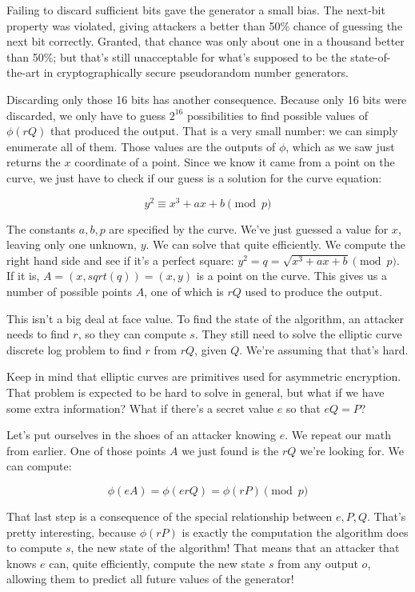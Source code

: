 \documentclass[11pt,ebook,table,dvipsnames]{memoir}
\begin{document}
Failing to discard sufficient bits gave the generator a small bias.
The next-bit property was violated, giving attackers a better than 50\%
chance of guessing the next bit correctly. Granted, that chance was
only about one in a thousand better than 50\%; but that's still
unacceptable for what's supposed to be the state-of-the-art in
cryptographically secure pseudorandom number generators.

Discarding only those 16 bits has another consequence. Because only 16
bits were discarded, we only have to guess $2^{16}$ possibilities to
find possible values of $\phi(rQ)$ that produced the output. That is a
very small number: we can simply enumerate all of them. Those values
are the outputs of $\phi$, which as we saw just returns the $x$
coordinate of a point. Since we know it came from a point on the
curve, we just have to check if our guess is a solution for the curve
equation:

\[
y^2 \equiv x^3 + ax + b \pmod p
\]

The constants $a, b, p$ are specified by the curve. We've just guessed
a value for $x$, leaving only one unknown, $y$. We can solve that
quite efficiently. We compute the right hand side and see if it's a
perfect square: $y^2 = q = \sqrt{x^3 + ax + b} \pmod p$. If it is, $A
= (x, sqrt(q)) = (x, y)$ is a point on the curve. This gives us a
number of possible points $A$, one of which is $rQ$ used to produce
the output.

This isn't a big deal at face value. To find the state of the
algorithm, an attacker needs to find $r$, so they can compute $s$.
They still need to solve the elliptic curve discrete log problem to
find $r$ from $rQ$, given $Q$. We're assuming that that's hard.

Keep in mind that elliptic curves are primitives used for asymmetric
encryption. That problem is expected to be hard to solve in general,
but what if we have some extra information? What if there's a secret
value $e$ so that $eQ=P$?

Let's put ourselves in the shoes of an attacker knowing $e$. We repeat
our math from earlier. One of those points $A$ we just found is the
$rQ$ we're looking for. We can compute:

\[
\phi(eA) = \phi(erQ) = \phi(rP) \pmod p
\]

That last step is a consequence of the special relationship between
$e, P, Q$. That's pretty interesting, because $\phi(rP)$ is exactly
the computation the algorithm does to compute $s$, the new state of
the algorithm! That means that an attacker that knows $e$ can, quite
efficiently, compute the new state $s$ from any output $o$, allowing
them to predict all future values of the generator!
\end{document}
